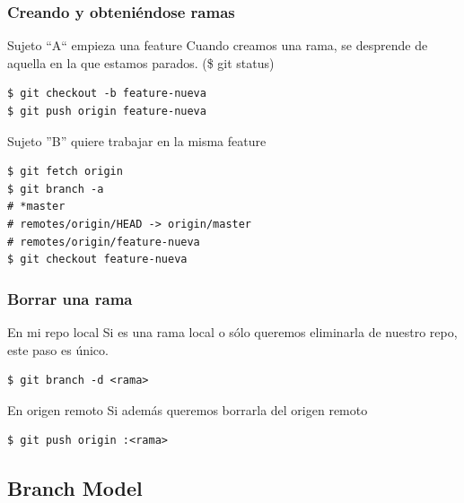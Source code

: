 \documentclass{beamer}
\begin{document}
\begin{frame}[fragile]\frametitle{Creando y obteniéndose ramas}

    \begin{block}{Sujeto ``A`` empieza una feature}
      Cuando creamos una rama, se desprende de aquella en la que estamos parados. (\$ git status)
      \begin{verbatim}
$ git checkout -b feature-nueva
$ git push origin feature-nueva
      \end{verbatim}
    \end{block} \pause
    
    \begin{block}{Sujeto ''B'' quiere trabajar en la misma feature}
      \begin{verbatim}
$ git fetch origin
$ git branch -a
# *master
# remotes/origin/HEAD -> origin/master
# remotes/origin/feature-nueva
$ git checkout feature-nueva
      \end{verbatim}
    \end{block}
  
\end{frame}

\begin{frame}[fragile]\frametitle{Borrar una rama}

    \begin{block}{En mi repo local}
      Si es una rama local o sólo queremos eliminarla de nuestro repo, este paso es único.
      \begin{verbatim}
$ git branch -d <rama>
      \end{verbatim}
    \end{block} \pause
    
    \begin{block}{En origen remoto}
      Si además queremos borrarla del origen remoto
      \begin{verbatim}
$ git push origin :<rama>
      \end{verbatim}
    \end{block}
  
\end{frame}

\subsection{Branch Model}
\end{document}
